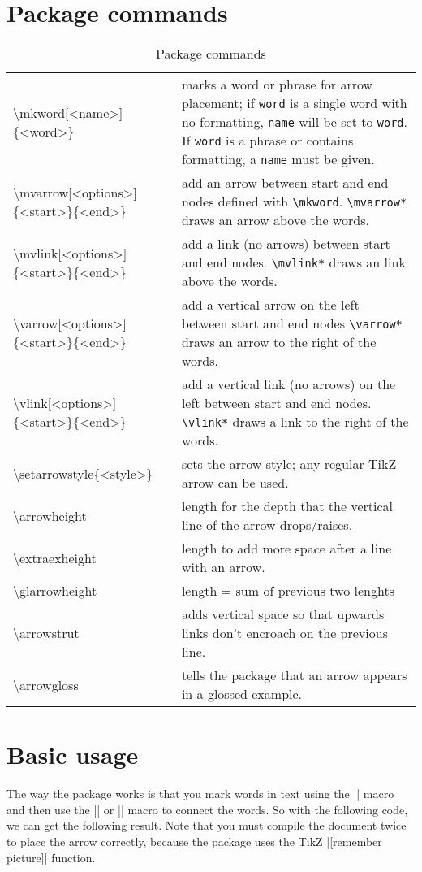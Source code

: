 \documentclass[11pt]{article}
\newcommand*{\pkg}[1]{\texttt{#1}}
\newcommand*{\bs}{\textbackslash}
\begin{document}
\section{Package commands}
\begin{table}[htpb]
\centering
\begin{tabularx}{\textwidth}{t{l}X}
\toprule
\bs mkword[<name>]\{<word>\} & marks a word or phrase for arrow placement; if \pkg{word} is a single word with no formatting, \pkg{name} will be set to \pkg{word}. If \pkg{word} is a phrase or contains formatting, a \pkg{name} must be given.\\
\bs mvarrow[<options>]\{<start>\}\{<end>\} & add an arrow between start and end nodes defined with \pkg{\bs mkword}. \pkg{\bs mvarrow*} draws an arrow above the words.\\
\bs mvlink[<options>]\{<start>\}\{<end>\} & add a link (no arrows) between start and end nodes. \pkg{\bs mvlink*} draws an link above the words. \\
\bs varrow[<options>]\{<start>\}\{<end>\} & add a vertical arrow on the left between start and end nodes \pkg{\bs varrow*} draws an arrow to the right of the words.\\
\bs vlink[<options>]\{<start>\}\{<end>\} & add a  vertical link (no arrows) on the left between start and end nodes. \pkg{\bs vlink*} draws a link to the right of the words. \\
\bs setarrowstyle\{<style>\} & sets the arrow style; any regular TikZ arrow can be used.\\
\bs arrowheight & length for the depth that the vertical line of the arrow drops/raises.\\
\bs extraexheight & length to add more space after a line with an arrow.\\
\bs glarrowheight & length = sum of previous two lenghts\\
\bs arrowstrut & adds vertical space so that upwards links don't encroach on the previous line.\\
\bs arrowgloss & tells the package that an arrow appears in a glossed example.\\
\bottomrule
\end{tabularx}
\caption{Package commands}
\end{table}
\section{Basic usage}
The way the package works is that you mark words in text using the |\mkword| macro and then use the |\mvarrow| or |\mvlink| macro to connect the words. So with the following code, we can get the following result.  Note that you must compile the document twice to place the arrow correctly, because the package uses the TikZ |[remember picture]| function.
\end{document}
